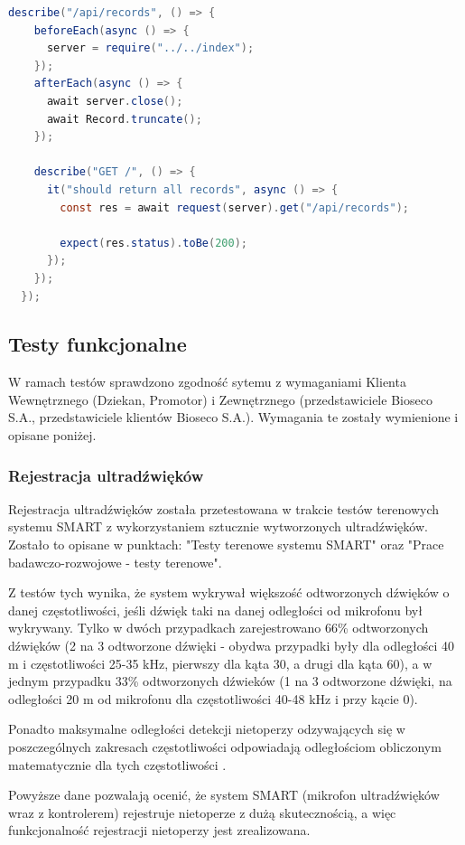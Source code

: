 \documentclass{sprz}
\begin{document}
\begin{lstlisting}[language=Java,caption={Test integracyjny z wykorzystaniem Supertest i Jest}, label={lst:Supertest}]
  describe("/api/records", () => {
    beforeEach(async () => {
      server = require("../../index");
    });
    afterEach(async () => {
      await server.close();
      await Record.truncate();
    });
  
    describe("GET /", () => {
      it("should return all records", async () => {
        const res = await request(server).get("/api/records");
  
        expect(res.status).toBe(200);
      });
    });
  });
\end{lstlisting}

\subsection{Testy funkcjonalne}
W ramach testów sprawdzono zgodność sytemu z wymaganiami Klienta Wewnętrznego (Dziekan, Promotor) i Zewnętrznego (przedstawiciele Bioseco S.A., przedstawiciele klientów Bioseco S.A.). Wymagania te zostały wymienione i opisane poniżej.

\subsubsection{Rejestracja ultradźwięków}
Rejestracja ultradźwięków została przetestowana w trakcie testów terenowych systemu SMART z wykorzystaniem sztucznie wytworzonych ultradźwięków. Zostało to opisane w punktach: "Testy terenowe systemu SMART" oraz "Prace badawczo-rozwojowe - testy terenowe". 

Z testów tych wynika, że system wykrywał większość odtworzonych dźwięków o danej częstotliwości, jeśli dźwięk taki na danej odległości od mikrofonu był wykrywany. Tylko w dwóch przypadkach zarejestrowano 66\% odtworzonych dźwięków (2 na 3 odtworzone dźwięki - obydwa przypadki były dla odległości 40 m i częstotliwości 25-35 kHz, pierwszy dla kąta 30\textdegree, a drugi dla kąta 60\textdegree ), a w jednym przypadku 33\% odtworzonych dźwieków (1 na 3 odtworzone dźwięki, na odległości 20 m od mikrofonu dla częstotliwości 40-48 kHz i przy kącie 0\textdegree).

Ponadto maksymalne odległości detekcji nietoperzy odzywających się w poszczególnych zakresach częstotliwości odpowiadają odległościom obliczonym matematycznie dla tych częstotliwości \cite{agranat}. 

Powyższe dane pozwalają ocenić, że system SMART (mikrofon ultradźwięków wraz z kontrolerem) rejestruje nietoperze z dużą skutecznością, a więc funkcjonalność rejestracji nietoperzy jest zrealizowana.
\end{document}
